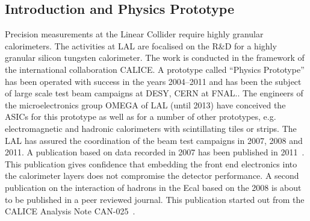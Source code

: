 \subsection{Introduction and Physics Prototype}
Precision measurements at the Linear Collider require highly granular calorimeters. The activities at LAL are focalised on the R\&D for a highly granular silicon tungsten calorimeter. The work is conducted in the framework of the international collaboration CALICE. A prototype called ``Physics Prototype'' has been operated with success in the years 2004--2011 and has been the subject of large scale test beam campaigns at DESY, CERN at FNAL.. The engineers of the microelectronics group OMEGA of LAL (until 2013) have conceived the ASICs for this prototype as well as for a number of other prototypes, e.g. electromagnetic and hadronic calorimeters with scintillating tiles or strips.
The LAL has assured the coordination of the beam test campaigns in 2007, 2008 and 2011. A publication based on data recorded in 2007 has been published in 2011~\cite{Adloff201197}. This publication gives confidence that embedding the front end electronics into the calorimeter layers does not compromise the detector performance. A second publication on the interaction of hadrons in the Ecal based on the 2008 is about to be published in a peer reviewed journal. This publication started out from the CALICE Analysis Note CAN-025~\cite{Adloff:CAN025}.

